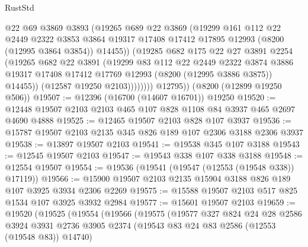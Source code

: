 \begin{lexlean}{RustStd}
\begin{coremodule}
                    @22
                    @69
                    @3869
                    @3893
                    (@19265
                      @689
                      @22
                      @3869
                      (@19299
                        @161
                        @112
                        @22
                        @2449
                        @2322
                        @3853
                        @3864
                        @19317
                        @17408
                        @17412
                        @17895
                        @12993
                        (@8200 (@12995 @3864 @3854))
                        @14455))
                    (@19285
                      @682
                      @175
                      @22
                      @27
                      @3891
                      @2254
                      (@19265
                        @682
                        @22
                        @3891
                        (@19299
                          @83
                          @112
                          @22
                          @2449
                          @2322
                          @3874
                          @3886
                          @19317
                          @17408
                          @17412
                          @17769
                          @12993
                          (@8200 (@12995 @3886 @3875))
                          @14455))
                      (@12587 @19250 @2103))))))))
        @12795))
    (@8200 (@12899 @19250 @506))
@19507 := @12396 (@16700 (@14607 @16701)) @19250
@19520 := @12448 @19507 @2103 @2103 @465 @107 @828 @1108 @84 @3937 @465 @2697 @4690 @4888
@19525 := @12465 @19507 @2103 @828 @107 @3937
@19536 := @15787 @19507 @2103 @2135 @345 @826 @189 @107 @2306 @3188 @2306 @3937
@19538 := @13897 @19507 @2103
@19541 := @19538 @345 @107 @3188
@19543 := @12545 @19507 @2103
@19547 := @19543 @338 @107 @338 @3188
@19548 := @12554 @19507
@19554 := @19536 (@19541 (@19547 (@12553 (@19548 @338)) @17119))
@19566 := @15900 @19507 @2103 @2135 @15904 @3188 @826 @189 @107 @3925 @3934 @2306 @2269
@19575 := @15588 @19507 @2103 @517 @825 @1534 @107 @3925 @3932 @2984
@19577 := @15601 @19507 @2103
@19659 := @19520
    (@19525
      (@19554
        (@19566
          (@19575
            (@19577
              @327
              @824
              @24
              @28
              @2586
              @3924
              @3931
              @2736
              @3905
              @2374
              (@19543 @83 @24 @83 @2586 (@12553 (@19548 @83)) @14740)

\end{coremodule}
\end{lexlean}
